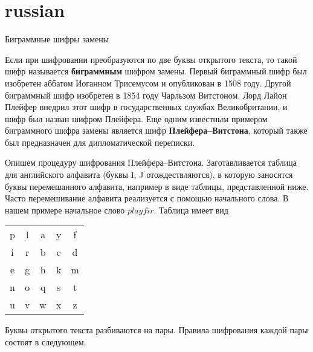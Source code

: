\section{russian}{Биграммные шифры замены}

Если при шифровании преобразуются по две буквы открытого текста, то такой шифр называется \textbf{биграммным} шифром замены. Первый биграммный шифр был изобретен аббатом Иоганном Трисемусом и опубликован в  1508 году. Другой биграммный шифр изобретен в 1854 году Чарльзом Витстоном.  Лорд Лайон Плейфер внедрил этот шифр в государственных службах Великобритании, и шифр был назван шифром Плейфера. Еще одним известным примером биграммного шифра замены является шифр  \textbf{Плейфера--Витстона}, который также был предназначен для дипломатической переписки.

Опишем процедуру шифрования Плейфера--Витстона. Заготавливается таблица для английского алфавита (буквы I, J отождествляются), в которую заносятся буквы перемешанного алфавита, например в виде таблицы, представленной ниже. Часто перемешивание алфавита реализуется с помощью начального слова. В нашем примере начальное слово $playfir$. Таблица имеет вид

\begin{center}
    \begin{tabular}{ccccc}
        p & l & a & y & f  \\
        i & r & b & c & d  \\
        e & g & h & k & m  \\
        n & o & q & s & t  \\
        u & v & w & x & z  \\
    \end{tabular}
\end{center}

Буквы открытого текста разбиваются на пары. Правила шифрования каждой пары состоят в следующем.

